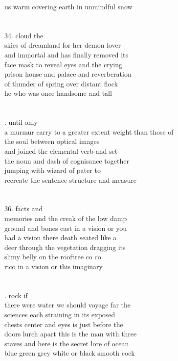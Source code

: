 \documentclass{article}
\begin{document}
us warm covering earth in unmindful snow\\
\\
\\
34. cloud the\\
skies of dreamland for her demon lover\\
and immortal and has finally removed its\\
face mask to reveal eyes and the crying\\
prison house and palace and reverberation\\
of thunder of spring over distant flock\\
he who was once handsome and tall\\
\\
\\
\newpage
{}. until only\\
a murmur carry to a greater extent weight than those of\\
the soul between optical images\\
and joined the elemental verb and set\\
the noun and dash of cognisance together\\
jumping with wizard of pater to\\
recreate the sentence structure and measure\\
\\
\\
36. facts and\\
memories and the creak of the low damp\\
ground and bones cast in a vision or you\\
had a vision there death seated like a\\
deer through the vegetation dragging its\\
slimy belly on the rooftree co co\\
rico in a vision or this imaginary\\
\\
\\
\newpage
{}. rock if\\
there were water we should voyage far the\\
sciences each straining in its exposed\\
chests center and eyes is just before the\\
doors lurch apart this is the man with three\\
staves and here is the secret lore of ocean\\
blue green grey white or black smooth cock\\
\end{document}
